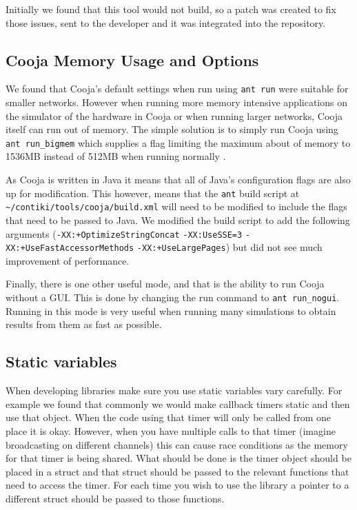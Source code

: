 Initially we found that this tool would not build, so a patch was created to fix those issues, sent to the developer and it was integrated into the repository.

\subsection{Cooja Memory Usage  and Options}

We found that Cooja's default settings when run using \verb|ant run| were suitable for smaller networks. However when running more memory intensive applications on the simulator of the hardware in Cooja or when running larger networks, Cooja itself can run out of memory. The simple solution is to simply run Cooja using \verb|ant run_bigmem| which supplies a flag limiting the maximum about of memory to 1536MB instead of 512MB when running normally \cite{?}.

As Cooja is written in Java \cite{?} it means that all of Java's configuration flags are also up for modification. This however, means that the \verb|ant| build script at \verb|~/contiki/tools/cooja/build.xml| will need to be modified to include the flags that need to be passed to Java. We modified the build script to add the following arguments (\verb|-XX:+OptimizeStringConcat| \verb|-XX:UseSSE=3| \verb|-XX:+UseFastAccessorMethods| \verb|-XX:+UseLargePages|) but did not see much improvement of performance.

Finally, there is one other useful mode, and that is the ability to run Cooja without a GUI. This is done by changing the run command to \verb|ant run_nogui|. Running in this mode is very useful when running many simulations to obtain results from them as fast as possible.


\subsection{Static variables}

When developing libraries make sure you use static variables vary carefully. For example we found that commonly we would make callback timers static and then use that object. When the code using that timer will only be called from one place it is okay. However, when you have multiple calls to that timer (imagine broadcasting on different channels) this can cause race conditions as the memory for that timer is being shared. What should be done is the timer object should be placed in a struct and that struct should be passed to the relevant functions that need to access the timer. For each time you wish to use the library a pointer to a different struct should be passed to those functions.

